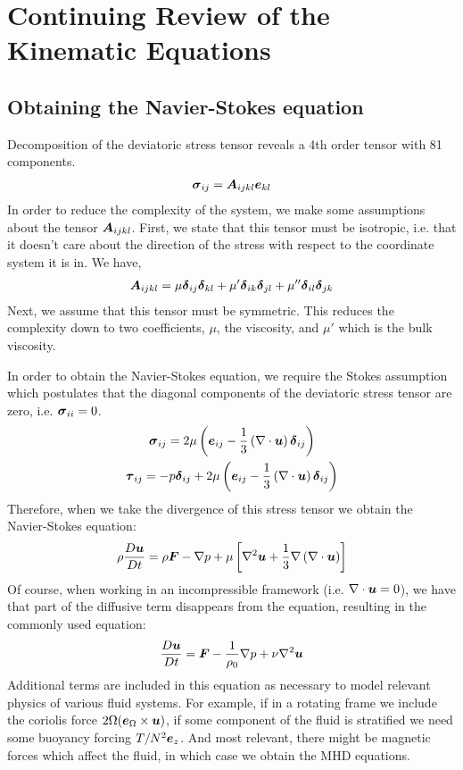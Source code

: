 \documentclass{article}
\begin{document}
\section{Continuing Review of the Kinematic Equations}

\subsection{Obtaining the Navier-Stokes equation}

Decomposition of the deviatoric stress tensor reveals a 4th order tensor with 81
components.
\begin{gather*}
    \boldsymbol{\sigma}_{ij} = \boldsymbol{A}_{ijkl}\boldsymbol{e}_{kl}
\end{gather*}
In order to reduce the complexity of the system, we make some assumptions about
the tensor $\boldsymbol{A}_{ijkl}$. First, we state that this tensor must be isotropic,
i.e. that it doesn't care about the direction of the stress with respect to the
coordinate system it is in. We have, 
\begin{gather*}
    \boldsymbol{A}_{ijkl} = \mu \boldsymbol{\delta}_{ij}\boldsymbol{\delta}_{kl} +
    \mu'\boldsymbol{\delta}_{ik}\boldsymbol{\delta}_{jl} +
    \mu''\boldsymbol{\delta}_{il}\boldsymbol{\delta}_{jk}
\end{gather*}
Next, we assume that this tensor must be symmetric. This reduces the complexity
down to two coefficients, $\mu$, the viscosity, and $\mu'$ which is the bulk viscosity. 

In order to obtain the Navier-Stokes equation, we require the Stokes assumption
which postulates that the diagonal components of the deviatoric stress tensor
are zero, i.e. $\boldsymbol{\sigma}_{ii} = 0$. 
\begin{gather*}
    \boldsymbol{\sigma}_{ij} = 2\mu\left(\boldsymbol{e}_{ij} -
    \frac{1}{3}\left(\nabla\cdot\boldsymbol{u}\right)\boldsymbol{\delta}_{ij}\right)    \\
    \boldsymbol{\tau}_{ij} = -p\boldsymbol{\delta}_{ij} + 2\mu\left(\boldsymbol{e}_{ij} -
    \frac{1}{3}\left(\nabla \cdot \boldsymbol{u}\right)\boldsymbol{\delta}_{ij}\right)
\end{gather*}
Therefore, when we take the divergence of this stress tensor we obtain the
Navier-Stokes equation:
\begin{gather*}
    \rho\frac{D \boldsymbol{u}}{D t} = \rho\boldsymbol{F} - \nabla p + \mu\left[ \nabla^2 \boldsymbol{u} +
    \frac{1}{3}\nabla \left(\nabla \cdot \boldsymbol{u}\right)\right]
\end{gather*}
Of course, when working in an incompressible framework (i.e. $\nabla\cdot\boldsymbol{u} =
0$), we have that part of the diffusive term disappears from the equation,
resulting in the commonly used equation:
\begin{gather}
    \label{eq:NS}
    \frac{D \boldsymbol{u}}{D t} = \boldsymbol{F} - \frac{1}{\rho_0}\nabla p + \nu\nabla^2 \boldsymbol{u}
\end{gather}
Additional terms are included in this equation as necessary to model relevant
physics of various fluid systems. For example, if in a rotating frame we include
the coriolis force $2\Omega(\boldsymbol{e}_{\Omega} \times \boldsymbol{u})$, if some component of
the fluid is stratified we need some buoyancy forcing $T/N^2\boldsymbol{e}_z$. And most
relevant, there might be magnetic forces which affect the fluid, in which case
we obtain the MHD equations. 
\end{document}
